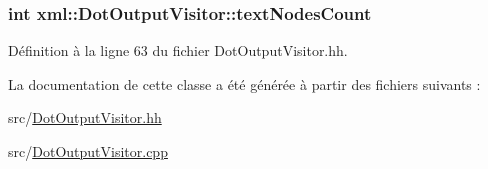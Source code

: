 \hypertarget{classxml_1_1_dot_output_visitor_a65f377e3a153b5cec4ba84a3c70c8d29}{
\subsubsection[{textNodesCount}]{\setlength{\rightskip}{0pt plus 5cm}int {\bf xml::DotOutputVisitor::textNodesCount}}}
\label{classxml_1_1_dot_output_visitor_a65f377e3a153b5cec4ba84a3c70c8d29}


Définition à la ligne 63 du fichier DotOutputVisitor.hh.



La documentation de cette classe a été générée à partir des fichiers suivants :\begin{DoxyCompactItemize}
\item 
src/\hyperlink{_dot_output_visitor_8hh}{DotOutputVisitor.hh}\item 
src/\hyperlink{_dot_output_visitor_8cpp}{DotOutputVisitor.cpp}\end{DoxyCompactItemize}
